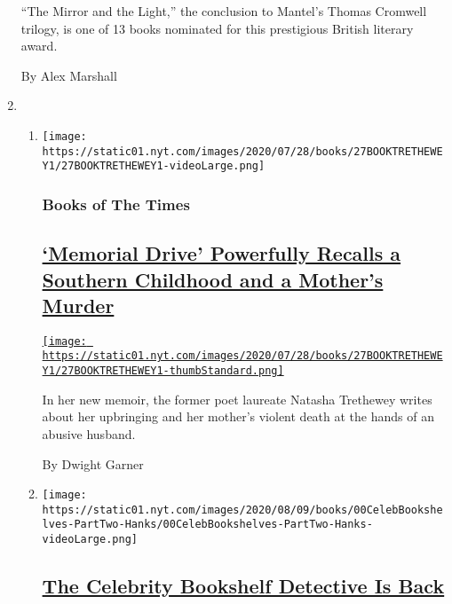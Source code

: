 \begin{enumerate}
  ``The Mirror and the Light,'' the conclusion to Mantel's Thomas
  Cromwell trilogy, is one of 13 books nominated for this prestigious
  British literary award.

  By Alex Marshall
\item
  \begin{enumerate}
  \def\labelenumii{\arabic{enumii}.}
  \item
    \texttt{[image: https://static01.nyt.com/images/2020/07/28/books/27BOOKTRETHEWEY1/27BOOKTRETHEWEY1-videoLarge.png]}

    \hypertarget{books-of-the-times-1}{%
    \subsubsection{Books of The Times}\label{books-of-the-times-1}}

    \hypertarget{memorial-drive-powerfully-recalls-a-southern-childhood-and-a-mothers-murder}{%
    \subsection{\texorpdfstring{\href{/2020/07/27/books/review-memorial-drive-memoir-natasha-trethewey.html}{`Memorial
    Drive' Powerfully Recalls a Southern Childhood and a Mother's
    Murder}}{`Memorial Drive' Powerfully Recalls a Southern Childhood and a Mother's Murder}}\label{memorial-drive-powerfully-recalls-a-southern-childhood-and-a-mothers-murder}}

    \href{/2020/07/27/books/review-memorial-drive-memoir-natasha-trethewey.html}{\texttt{[image: https://static01.nyt.com/images/2020/07/28/books/27BOOKTRETHEWEY1/27BOOKTRETHEWEY1-thumbStandard.png]}}

    In her new memoir, the former poet laureate Natasha Trethewey writes
    about her upbringing and her mother's violent death at the hands of
    an abusive husband.

    By Dwight Garner
  \item
    \texttt{[image: https://static01.nyt.com/images/2020/08/09/books/00CelebBookshelves-PartTwo-Hanks/00CelebBookshelves-PartTwo-Hanks-videoLarge.png]}

    \hypertarget{the-celebrity-bookshelf-detective-is-back}{%
    \subsection{\texorpdfstring{\href{/2020/07/27/books/tom-hanks-gwyneth-paltrow-bookshelves.html}{The
    Celebrity Bookshelf Detective Is
    Back}}{The Celebrity Bookshelf Detective Is Back}}\label{the-celebrity-bookshelf-detective-is-back}}


\end{enumerate}
\end{enumerate}
